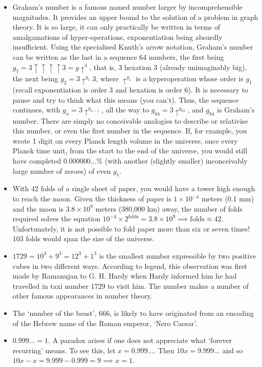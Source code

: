 \documentclass[11pt]{amsart}
\begin{document}
\begin{itemize}
\item Graham's number is a famous named number larger by incomprehensible magnitudes. It provides an upper bound to the solution of a problem in graph theory. It is so large, it can only practically be written in terms of amalgamations of hyper-operations, exponentiation being absurdly insufficient. Using the specialised Knuth's arrow notation, Graham's number can be written as the last in a sequence 64 numbers, the first being $g_1 = 3\uparrow\uparrow\uparrow\uparrow3 = g\uparrow^4$, that is, 3 hexation 3 (already unimaginably big), the next being $g_2 = 3\uparrow^{g_1}3$, where $\uparrow^{g_1}$ is a hyperoperation whose order is $g_1$ (recall exponentiation is order 3 and hexation is order 6). It is necessary to pause and try to think what this means (you can't). Thus, the sequence continues, with $g_n = 3\uparrow^{g_{n-1}}$, all the way to $g_{64} = 3\uparrow^{g_{63}}$, and $g_{64}$ is Graham's number. There are simply no conceivable analogies to describe or relativise this number, or even the first number in the sequence. If, for example, you wrote 1 digit on every Planck length volume in the universe, once every Planck time unit, from the start to the end of the universe, you would still have completed $0.000000...\%$ (with another (slightly smaller) inconceivably large number of zeroes) of even $g_1$.
\item With 42 folds of a single sheet of paper, you would have a tower high enough to reach the moon. Given the thickness of paper is $1 \times 10^{-4}$ meters (0.1 mm) and the moon is $3.8 \times 10^{9}$ meters (380,000 km) away, the number of folds required solves the equation $10^{-4}\times 2^{\text{folds}} = 3.8\times10^9 \implies \text{folds} \approx 42$. Unfortunately, it is not possible to fold paper more than six or seven times! 103 folds would span the size of the universe.
\item $1729 = 10^3 + 9^3 = 12^3 + 1^3$ is the smallest number expressible by two positive cubes in two different ways. According to legend, this observation was first made by Ramanujan to G. H. Hardy when Hardy informed him he had travelled in taxi number 1729 to visit him. The number makes a number of other famous appearances in number theory.
\item The `number of the beast', 666, is likely to have originated from an encoding of the Hebrew name of the Roman emperor, `Nero Caesar'.
\item $0.999... = 1$. A paradox arises if one does not appreciate what `forever recurring' means. To see this, let $x = 0.999...$. Then $10x = 9.999...$ and so $10x - x = 9.999 - 0.999 = 9 \implies x = 1$.

\end{itemize}
\end{document}
